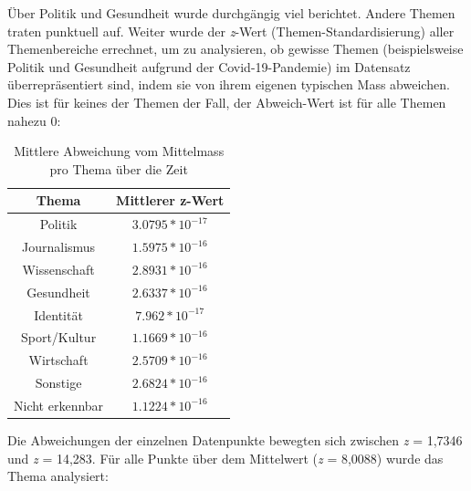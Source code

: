 \documentclass[12pt,a4paper]{article}        %
\begin{document}
Über Politik und Gesundheit wurde durchgängig viel berichtet. Andere Themen traten punktuell auf.
Weiter wurde der \textit{z}-Wert (Themen-Standardisierung) aller Themenbereiche errechnet, um zu analysieren, ob gewisse Themen (beispielsweise Politik und Gesundheit aufgrund der Covid-19-Pandemie) im Datensatz überrepräsentiert sind, indem sie von ihrem eigenen typischen Mass abweichen. Dies ist für keines der Themen der Fall, der Abweich-Wert ist für alle Themen nahezu 0:
\begin{table}[H]
  \centering
  \begin{tabular}{|c|c|} \hline
    \textbf{Thema}&  \textbf{Mittlerer z-Wert}\\ \hline
    Politik&  \(3.0795*10^{-17}\)\\ \hline
    Journalismus&  \(1.5975*10^{-16}\)\\ \hline
    Wissenschaft&  \(2.8931*10^{-16}\)\\ \hline
    Gesundheit&  \(2.6337*10^{-16}\)\\ \hline
    Identität&  \(7.962*10^{-17}\)\\ \hline
    Sport/Kultur&  \(1.1669*10^{-16}\)\\ \hline
    Wirtschaft&  \(2.5709*10^{-16}\)\\ \hline
    Sonstige&  \(2.6824*10^{-16}\)\\ \hline
    Nicht erkennbar& \(1.1224*10^{-16}\)\\ \hline
  \end{tabular}
  \caption{Mittlere Abweichung vom Mittelmass pro Thema über die Zeit}
  \label{tab:results_date_dependency_topic_deviation}
\end{table}
Die Abweichungen der einzelnen Datenpunkte bewegten sich zwischen \textit{z} = 1,7346 und \textit{z} = 14,283. Für alle Punkte über dem Mittelwert (\textit{z} = 8,0088) wurde das Thema analysiert:
\begin{table}[H]
  \centering
  \caption{Tage mit besonders starker Abweichung vom Mittelmass der Themen}
  \label{tab:results_spike_days}
\end{table}
\end{document}
